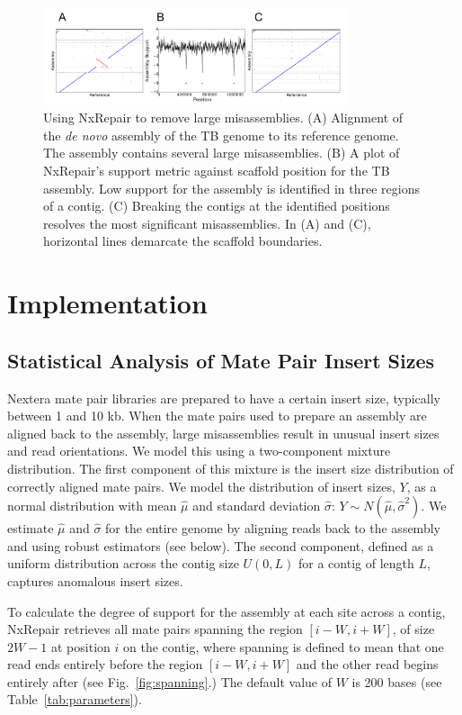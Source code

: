 \documentclass[fleqn,10pt]{wlpeerj}
\begin{document}
\begin{figure}
\centerline{\includegraphics[width=0.8\textwidth]{fig1_nxrepair.pdf}}
\caption{Using NxRepair to remove large misassemblies. (A) Alignment of the \textit{de novo} assembly of the TB genome to its reference genome. The assembly contains several large misassemblies. (B) A plot of NxRepair's support metric against scaffold position for the TB assembly. Low support for the assembly is identified in three regions of a contig. (C) Breaking the contigs at the identified positions resolves the most significant misassemblies. In (A) and (C), horizontal lines demarcate the scaffold boundaries.}\label{fig:NxRepair}
\end{figure}

\section*{Implementation}
\subsection*{Statistical Analysis of Mate Pair Insert Sizes}
Nextera mate pair libraries are prepared to have a certain insert size, typically between 1 and 10 kb. When the mate pairs used to prepare an assembly are aligned back to the assembly, large misassemblies result in unusual insert sizes and read orientations. We model this using a two-component mixture distribution. The first component of this mixture is the insert size distribution of correctly aligned mate pairs.  We model the distribution of insert sizes, $Y$, as a normal distribution with mean $\hat{\mu}$ and standard deviation $\hat{\sigma}$: $Y \sim N(\hat{\mu},\hat{\sigma}^2).$ We estimate $\hat{\mu}$ and $\hat{\sigma}$ for the entire genome by aligning reads back to the assembly and using robust estimators (see below). The second component, defined as a uniform distribution across the contig size $U(0,L)$ for a contig of length $L$, captures anomalous insert sizes. 

To calculate the degree of support for the assembly at each site across a contig, NxRepair retrieves all mate pairs spanning the region $[i-W, i+W]$, of size $2W-1$ at position $i$ on the contig, where spanning is defined to mean that one read ends entirely before the region $[i-W, i+W]$ and the other read begins entirely after (see Fig.~\ref{fig:spanning}.) The default value of $W$ is 200 bases (see Table~\ref{tab:parameters}). 
\end{document}
